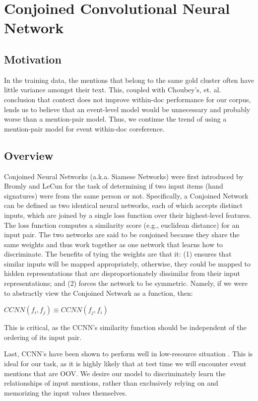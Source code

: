 \documentclass[11pt,a4paper]{article}
\begin{document}
\section{Conjoined Convolutional Neural Network}
\label{sec:CCNN}
\subsection{Motivation}
In the training data, the mentions that belong to the same gold cluster often have little variance amongst their text.  This, coupled with Choubey's, et. al.  conclusion that context does not improve within-doc performance for our corpus, lends us to believe that an event-level model would be unnecessary and probably worse than a mention-pair model.  Thus, we continue the trend of using a mention-pair model for event within-doc coreference.

\subsection{Overview}
Conjoined Neural Networks (a.k.a. Siamese Networks) were first introduced by Bromly and LeCun  for the task of determining if two input items (hand signatures) were from the same person or not.  Specifically, a Conjoined Network can be defined as two identical neural networks, each of which accepts distinct inputs, which are joined by a single loss function over their highest-level features.  The loss function computes a similarity score (e.g., euclidean distance) for an input pair.  The two networks are said to be conjoined because they share the same weights and thus work together as one network that learns how to discriminate.  The benefits of tying the weights are that it: (1) ensures that similar inputs will be mapped appropriately, otherwise, they could be mapped to hidden representations that are disproportionately dissimilar from their input representations; and (2) forces the network to be symmetric.  Namely, if we were to abstractly view the Conjoined Network as a function, then:

\vspace{4mm}

 $CCNN(f_i,f_j) \equiv CCNN(f_j,f_i)$

\vspace{4mm}

This is critical, as the CCNN's similarity function should be independent of the ordering of its input pair.

Last, CCNN's have been shown to perform well in low-resource situation \cite{Koch2015SiameseNN}.  This is ideal for our task, as it is highly likely that at test time we will encounter event mentions that are OOV.  We desire our model to discriminately learn the relationships of input mentions, rather than exclusively relying on and memorizing the input values themselves.
\end{document}
